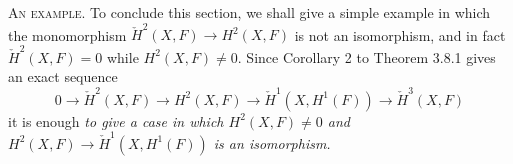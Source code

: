 \textsc{An example.} To conclude this section, we shall give a simple
example in which the monomorphism
$\check H^2(X,F)\to H^2(X,F)$ is not an isomorphism, and in fact
$\check H^2(X,F)=0$ while $H^2(X,F)\neq 0$. Since Corollary 2 to Theorem 3.8.1
gives an exact sequence
\[
0\to\check H^2(X,F)\to H^2(X,F)
\to\check H^1(X,H^1(F))\to\check H^3(X,F)
\]
it is enough \textit{to give a case in which $H^2(X,F)\neq 0$ and
$H^2(X,F)\to\check H^1(X,H^1(F))$ is an isomorphism.}

